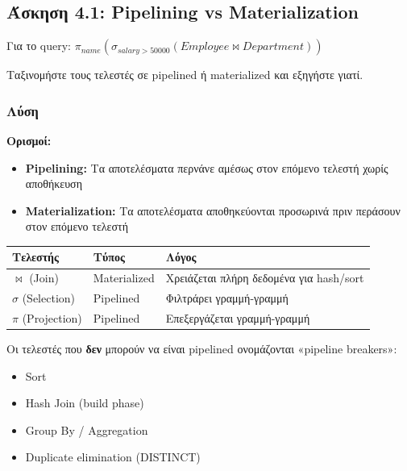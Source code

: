 \subsection{Άσκηση 4.1: Pipelining vs Materialization}

\begin{formulabox}[Εκφώνηση]
Για το query: $\pi_{name}(\sigma_{salary>50000}(Employee \bowtie Department))$

Ταξινομήστε τους τελεστές σε pipelined ή materialized και εξηγήστε γιατί.
\end{formulabox}

\subsubsection*{Λύση}

\textbf{Ορισμοί:}
\begin{itemize}
    \item \textbf{Pipelining:} Τα αποτελέσματα περνάνε αμέσως στον επόμενο τελεστή χωρίς αποθήκευση
    \item \textbf{Materialization:} Τα αποτελέσματα αποθηκεύονται προσωρινά πριν περάσουν στον επόμενο τελεστή
\end{itemize}

\begin{center}
\begin{tabular}{lll}
\toprule
\textbf{Τελεστής} & \textbf{Τύπος} & \textbf{Λόγος} \\
\midrule
$\bowtie$ (Join) & Materialized & Χρειάζεται πλήρη δεδομένα για hash/sort \\
$\sigma$ (Selection) & Pipelined & Φιλτράρει γραμμή-γραμμή \\
$\pi$ (Projection) & Pipelined & Επεξεργάζεται γραμμή-γραμμή \\
\bottomrule
\end{tabular}
\end{center}

\begin{infobox}
Οι τελεστές που \textbf{δεν} μπορούν να είναι pipelined ονομάζονται «pipeline breakers»:
\begin{itemize}
    \item Sort
    \item Hash Join (build phase)
    \item Group By / Aggregation
    \item Duplicate elimination (DISTINCT)
\end{itemize}
\end{infobox}

